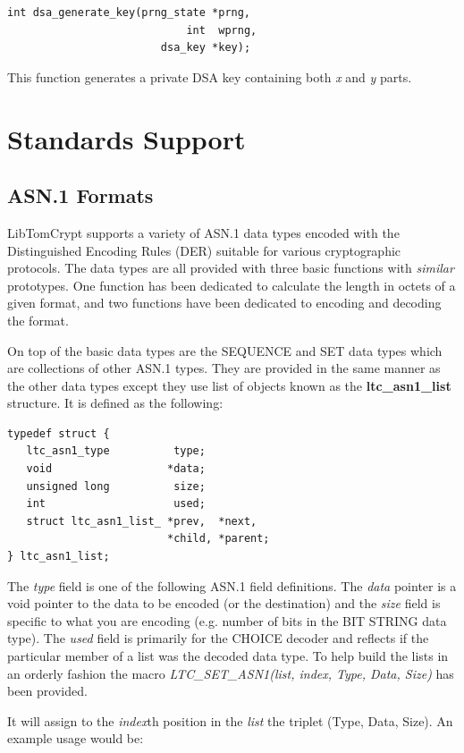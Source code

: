 \documentclass[synpaper]{book}
\newcommand{\mysection}[1]    %
	{                   %
	\section{#1}
   \markboth{\textsf{www.libtom.net}}{\thesection ~ {#1}}
	}
\begin{document}
\begin{verbatim}
int dsa_generate_key(prng_state *prng,
                            int  wprng,
                        dsa_key *key);
\end{verbatim}

This function generates a private DSA key containing both \textit{x} and \textit{y} parts.

\chapter{Standards Support}
\mysection{ASN.1 Formats}
LibTomCrypt supports a variety of ASN.1 data types encoded with the Distinguished Encoding Rules (DER) suitable for various cryptographic protocols.  The data types
are all provided with three basic functions with \textit{similar} prototypes.  One function has been dedicated to calculate the length in octets of a given
format, and two functions have been dedicated to encoding and decoding the format.

On top of the basic data types are the SEQUENCE and SET data types which are collections of other ASN.1 types.  They are provided
in the same manner as the other data types except they use list of objects known as the \textbf{ltc\_asn1\_list} structure.  It is defined as the following:

\begin{verbatim}
typedef struct {
   ltc_asn1_type          type;
   void                  *data;
   unsigned long          size;
   int                    used;
   struct ltc_asn1_list_ *prev,  *next,
                         *child, *parent;
} ltc_asn1_list;
\end{verbatim}

The \textit{type} field is one of the following ASN.1 field definitions.  The \textit{data} pointer is a void pointer to the data to be encoded (or the destination) and the
\textit{size} field is specific to what you are encoding (e.g. number of bits in the BIT STRING data type).  The \textit{used} field is primarily for the CHOICE decoder
and reflects if the particular member of a list was the decoded data type.  To help build the lists in an orderly fashion the macro
\textit{LTC\_SET\_ASN1(list, index, Type, Data, Size)} has been provided.

It will assign to the \textit{index}th position in the \textit{list} the triplet (Type, Data, Size).  An example usage would be:
\end{document}

